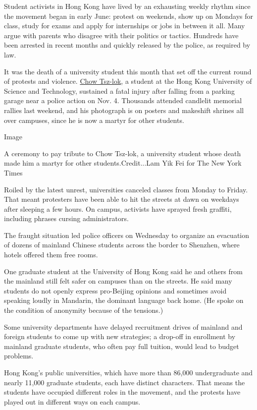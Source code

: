 Student activists in Hong Kong have lived by an exhausting weekly rhythm
since the movement began in early June: protest on weekends, show up on
Mondays for class, study for exams and apply for internships or jobs in
between it all. Many argue with parents who disagree with their politics
or tactics. Hundreds have been arrested in recent months and quickly
released by the police, as required by law.

It was the death of a university student this month that set off the
current round of protests and violence.
\href{https://www.nytimes3xbfgragh.onion/2019/11/07/world/asia/hong-kong-protest-student-dies.html}{Chow
Tsz-lok}, a student at the Hong Kong University of Science and
Technology, sustained a fatal injury after falling from a parking garage
near a police action on Nov. 4. Thousands attended candlelit memorial
rallies last weekend, and his photograph is on posters and makeshift
shrines all over campuses, since he is now a martyr for other students.

Image

A ceremony to pay tribute to Chow Tsz-lok, a university student whose
death made him a martyr for other students.Credit...Lam Yik Fei for The
New York Times

Roiled by the latest unrest, universities canceled classes from Monday
to Friday. That meant protesters have been able to hit the streets at
dawn on weekdays after sleeping a few hours. On campus, activists have
sprayed fresh graffiti, including phrases cursing administrators.

The fraught situation led police officers on Wednesday to organize an
evacuation of dozens of mainland Chinese students across the border to
Shenzhen, where hotels offered them free rooms.

One graduate student at the University of Hong Kong said he and others
from the mainland still felt safer on campuses than on the streets. He
said many students do not openly express pro-Beijing opinions and
sometimes avoid speaking loudly in Mandarin, the dominant language back
home. (He spoke on the condition of anonymity because of the tensions.)

Some university departments have delayed recruitment drives of mainland
and foreign students to come up with new strategies; a drop-off in
enrollment by mainland graduate students, who often pay full tuition,
would lead to budget problems.

Hong Kong's public universities, which have more than 86,000
undergraduate and nearly 11,000 graduate students, each have distinct
characters. That means the students have occupied different roles in the
movement, and the protests have played out in different ways on each
campus.


